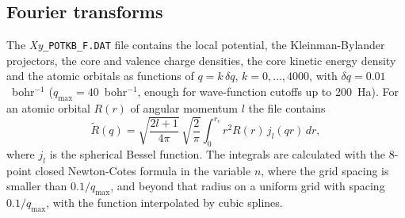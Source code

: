 \documentclass[11pt]{article}
\begin{document}
\subsection{Fourier transforms}
\label{sec:fourier}

The \textit{Xy}\texttt{\_POTKB\_F.DAT} file contains the local potential, the Kleinman-Bylander
projectors, the core and valence charge densities, the core kinetic energy density
and the atomic orbitals as functions of
$q = k\, \delta q$, $k = 0, \ldots, 4000$, with $\delta q = 0.01$~bohr$^{-1}$
($q_\text{max} = 40$~bohr$^{-1}$, enough for wave-function cutoffs up to 200~Ha).
For an atomic orbital $R(r)$ of angular momentum $l$ the file contains
\begin{equation}
   \tilde R(q) = \sqrt{\frac{2l+1}{4\pi}}\, \sqrt{\frac{2}{\pi}} \int_0^{r_c} r^2 R(r)\, j_l(qr)\, dr,
\end{equation}
where $j_l$ is the spherical Bessel function.
The integrals are calculated with the 8-point closed Newton-Cotes formula in the variable $n$,
where the grid spacing is smaller than $0.1/q_\text{max}$, and beyond that radius on a
uniform grid with spacing $0.1/q_\text{max}$, with the function interpolated by cubic splines.
\end{document}
